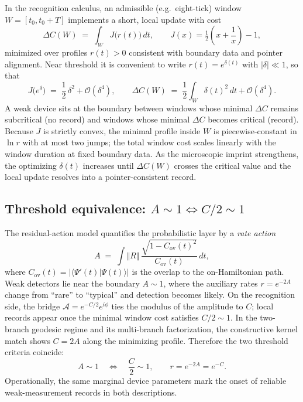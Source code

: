 \documentclass[11pt,letterpaper]{article}
\theoremstyle{definition}
\begin{document}
In the recognition calculus, an admissible (e.g.\ eight-tick) window $W=[t_0,t_0+T]$ implements a short, local update with cost
\begin{equation}
\Delta C(W)\;=\;\int_{W}\!J\!\bigl(r(t)\bigr)\,dt,
\qquad
J(x)=\tfrac12\!\left(x+\frac1x\right)-1,
\end{equation}
minimized over profiles $r(t)>0$ consistent with boundary data and pointer alignment. Near threshold it is convenient to write $r(t)=e^{\delta(t)}$ with $\vert \delta\vert\ll 1$, so that
\begin{equation}
J\!\bigl(e^{\delta}\bigr)\;=\;\frac12\,\delta^2+\mathcal O(\delta^4),
\qquad
\Delta C(W)\;=\;\frac12\int_{W}\!\delta(t)^2\,dt+\mathcal O(\delta^4).
\end{equation}
A weak device sits at the boundary between windows whose minimal $\Delta C$ remains subcritical (no record) and windows whose minimal $\Delta C$ becomes critical (record). Because $J$ is strictly convex, the minimal profile inside $W$ is piecewise-constant in $\ln r$ with at most two jumps; the total window cost scales linearly with the window duration at fixed boundary data. As the microscopic imprint strengthens, the optimizing $\delta(t)$ increases until $\Delta C(W)$ crosses the critical value and the local update resolves into a pointer-consistent record.

\subsection{Threshold equivalence: \texorpdfstring{$A\sim 1 \Longleftrightarrow C/2\sim 1$}{A\textasciitilde1 <=> C/2\textasciitilde1}}

The residual-action model quantifies the probabilistic layer by a \emph{rate action}
\begin{equation}
A\;=\;\int\!\Vert R\Vert\,\frac{\sqrt{1-C_{\mathrm{ov}}(t)^2}}{C_{\mathrm{ov}}(t)}\,dt,
\end{equation}
where $C_{\mathrm{ov}}(t)=\vert\langle\Psi'(t)\vert\Psi(t)\rangle\vert$ is the overlap to the on-Hamiltonian path. Weak detectors lie near the boundary $A\sim 1$, where the auxiliary rates $r=e^{-2A}$ change from ``rare'' to ``typical'' and detection becomes likely.
On the recognition side, the bridge $\mathcal A=e^{-C/2}e^{i\phi}$ ties the modulus of the amplitude to $C$; local records appear once the minimal window cost satisfies $C/2\sim 1$. In the two-branch geodesic regime and its multi-branch factorization, the constructive kernel match shows $C=2A$ along the minimizing profile. Therefore the two threshold criteria coincide:
\begin{equation}
A\sim 1 \quad\Longleftrightarrow\quad \frac{C}{2}\sim 1,
\qquad
r=e^{-2A}=e^{-C}.
\end{equation}
Operationally, the same marginal device parameters mark the onset of reliable weak-measurement records in both descriptions.
\end{document}
